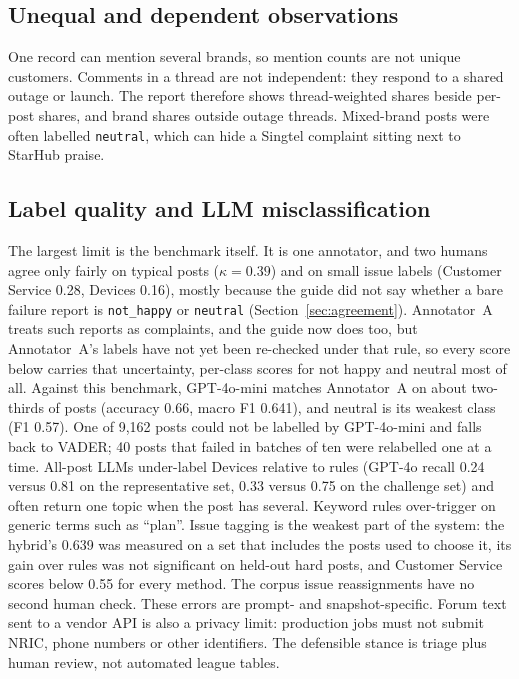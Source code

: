 \documentclass[11pt,a4paper]{article}
\begin{document}
\subsection{Unequal and dependent observations}

One record can mention several brands, so mention counts are not unique customers. Comments in a thread are not independent: they respond to a shared outage or launch. The report therefore shows thread-weighted shares beside per-post shares, and brand shares outside outage threads. Mixed-brand posts were often labelled \texttt{neutral}, which can hide a Singtel complaint sitting next to StarHub praise.

\subsection{Label quality and LLM misclassification}

The largest limit is the benchmark itself. It is one annotator, and two humans agree only fairly on typical posts ($\kappa=0.39$) and on small issue labels (Customer Service 0.28, Devices 0.16), mostly because the guide did not say whether a bare failure report is \texttt{not\_happy} or \texttt{neutral} (Section~\ref{sec:agreement}). Annotator~A treats such reports as complaints, and the guide now does too, but Annotator~A's labels have not yet been re-checked under that rule, so every score below carries that uncertainty, per-class scores for not happy and neutral most of all. Against this benchmark, GPT-4o-mini matches Annotator~A on about two-thirds of posts (accuracy 0.66, macro F1 0.641), and neutral is its weakest class (F1 0.57). One of 9,162 posts could not be labelled by GPT-4o-mini and falls back to VADER; 40 posts that failed in batches of ten were relabelled one at a time. All-post LLMs under-label Devices relative to rules (GPT-4o recall 0.24 versus 0.81 on the representative set, 0.33 versus 0.75 on the challenge set) and often return one topic when the post has several. Keyword rules over-trigger on generic terms such as ``plan''. Issue tagging is the weakest part of the system: the hybrid's 0.639 was measured on a set that includes the posts used to choose it, its gain over rules was not significant on held-out hard posts, and Customer Service scores below 0.55 for every method. The corpus issue reassignments have no second human check. These errors are prompt- and snapshot-specific. Forum text sent to a vendor API is also a privacy limit: production jobs must not submit NRIC, phone numbers or other identifiers. The defensible stance is triage plus human review, not automated league tables.
\end{document}
